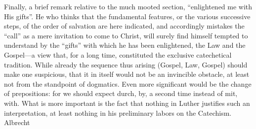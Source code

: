 Finally, a brief remark relative to the much mooted section, “enlightened me with His gifts”. He who thinks that the fundamental features, or the various successive steps, of the order of salvation are here indicated, and accordingly mistakes the “call” as a mere invitation to come to Christ, will surely find himself tempted to understand by the “gifts” with which he has been enlightened, the Law and the Gospel—a view that, for a long time, constituted the exclusive catechetical tradition. While already the sequence thus arising (Gospel, Law, Gospel) should make one suspicious, that it in itself would not be an invincible obstacle, at least not from the standpoint of dogmatics. Even more significant would be the change of prepositions: for we should expect durch, by, a second time instead of mit, with. What is more important is the fact that nothing in Luther justifies such an interpretation, at least nothing in his preliminary labors on the Catechism. Albrecht
